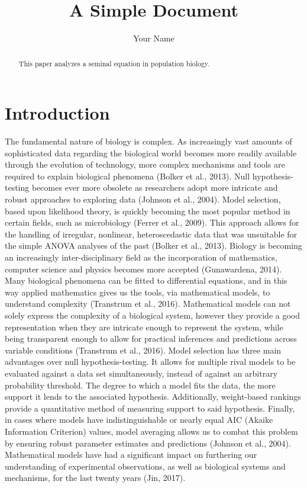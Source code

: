 \documentclass[11pt]{article}
\title{A Simple Document}
\author{Your Name}
\date{}
\begin{document}
  \maketitle
  
  \begin{abstract}
    This paper analyzes a seminal equation in population biology.
  \end{abstract}
  
  \section{Introduction}
    The fundamental nature of biology is complex. As increasingly vast amounts of sophisticated data regarding the biological world becomes more readily available through the evolution of technology, more complex mechanisms and tools are required to explain biological phenomena (Bolker et al., 2013). Null hypothesis-testing becomes ever more obsolete as researchers adopt more intricate and robust approaches to exploring data (Johnson et al., 2004). Model selection, based upon likelihood theory, is quickly becoming the most popular method in certain fields, such as microbiology (Ferrer et al., 2009). This approach allows for the handling of irregular, nonlinear, heteroscedastic data that was unsuitable for the simple ANOVA analyses of the past (Bolker et al., 2013). Biology is becoming an increasingly inter-disciplinary field as the incorporation of mathematics, computer science and physics becomes more accepted (Gunawardena, 2014). Many biological phenomena can be fitted to differential equations, and in this way applied mathematics gives us the tools, via mathematical models, to understand complexity (Transtrum et al., 2016). Mathematical models can not solely express the complexity of a biological system, however they provide a good representation when they are intricate enough to represent the system, while being transparent enough to allow for practical inferences and predictions across variable conditions (Transtrum et al., 2016). Model selection has three main advantages over null hypothesis-testing. It allows for multiple rival models to be evaluated against a data set simultaneously, instead of against an arbitrary probability threshold. The degree to which a model fits the data, the more support it lends to the associated hypothesis. Additionally, weight-based rankings provide a quantitative method of measuring support to said hypothesis. Finally, in cases where models have indistinguishable or nearly equal AIC (Akaike Information Criterion) values, model averaging allows us to combat this problem by ensuring robust parameter estimates and predictions (Johnson et al., 2004). Mathematical models have had a significant impact on furthering our understanding of experimental observations, as well as biological systems and mechanisms, for the last twenty years (Jin, 2017). 
  
\end{document}
